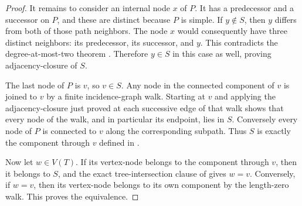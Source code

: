 \begin{proof}
It remains to consider an internal node $x$ of $P$.  It has a predecessor
and a successor on $P$, and these are distinct because $P$ is simple.  If
$y\notin S$, then $y$ differs from both of those path neighbors.  The node
$x$ would consequently have three distinct neighbors: its predecessor,
its successor, and $y$.  This contradicts the degree-at-most-two theorem
.  Therefore $y\in S$ in this
case as well, proving adjacency-closure of $S$.

The last node of $P$ is $v$, so $v\in S$.  Any node in the connected
component of $v$ is joined to $v$ by a finite incidence-graph walk.
Starting at $v$ and applying the adjacency-closure just proved at each
successive edge of that walk shows that every node of the walk, and in
particular its endpoint, lies in $S$.  Conversely every node of $P$ is
connected to $v$ along the corresponding subpath.  Thus $S$ is exactly
the component through $v$ defined in .

Now let $w\in V(T)$.  If its vertex-node belongs to the component through
$v$, then it belongs to $S$, and the exact tree-intersection clause of
 gives $w=v$.  Conversely, if $w=v$, then its
vertex-node belongs to its own component by the length-zero walk.  This
proves the equivalence.
\end{proof}
